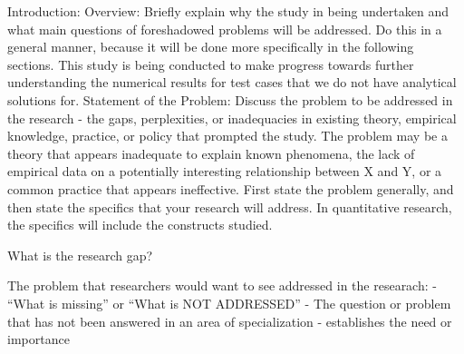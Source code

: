 \documentclass[a4paper]{report}
\begin{document}
\begin{outline}[enumerate]
    \1 Introduction:
    \1[1-A.] Overview: Briefly explain why the study in being undertaken and what 
    main questions of foreshadowed problems will be addressed. Do this in a 
    general manner, because it will be done more specifically in the 
    following sections.
    This study is being conducted to make progress towards further understanding
    the numerical results for test cases that we do not have analytical solutions
    for.
    \1[1-B.] Statement of the Problem: Discuss the problem to be addressed in the
    research - the gaps, perplexities, or inadequacies in existing theory, 
    empirical knowledge, practice, or policy that prompted the study. The problem may be
    a theory that appears inadequate to explain known phenomena, the lack of 
    empirical data on a potentially interesting relationship between X and Y,
    or a common practice that appears ineffective. First state the problem
    generally, and then state the specifics that your research will address. In 
    quantitative research, the specifics will include the constructs studied.

    What is the research gap?

    The problem that researchers would want to see addressed in the researach:
    - ``What is missing'' or ``What is NOT ADDRESSED''
    - The question or problem that has not been answered in an area of specialization 
    - establishes the need or importance
    

\end{outline}
\end{document}
